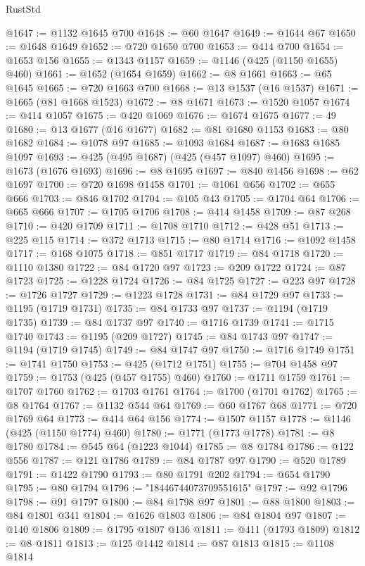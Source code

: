 \begin{lexlean}{RustStd}
\begin{coremodule}
{\begin{coremodule}
{{{{{{{{{{{{{{{{{{{{{{{{{{{{{{{{{{{{{{{{{{{{{{{{{{{{{{@1647 := @1132 @1645 @700
@1648 := @60 @1647
@1649 := @1644 @67
@1650 := @1648 @1649
@1652 := @720 @1650 @700
@1653 := @414 @700
@1654 := @1653 @156
@1655 := @1343 @1157
@1659 := @1146 (@425 (@1150 @1655) @460)
@1661 := @1652 (@1654 @1659)
@1662 := @8 @1661
@1663 := @65 @1645
@1665 := @720 @1663 @700
@1668 := @13 @1537 (@16 @1537)
@1671 := @1665 (@81 @1668 @1523)
@1672 := @8 @1671
@1673 := @1520 @1057
@1674 := @414 @1057
@1675 := @420 @1069
@1676 := @1674 @1675
@1677 := 49
@1680 := @13 @1677 (@16 @1677)
@1682 := @81 @1680 @1153
@1683 := @80 @1682
@1684 := @1078 @97
@1685 := @1093 @1684
@1687 := @1683 @1685 @1097
@1693 := @425 (@495 @1687) (@425 (@457 @1097) @460)
@1695 := @1673 (@1676 @1693)
@1696 := @8 @1695
@1697 := @840 @1456
@1698 := @62 @1697
@1700 := @720 @1698 @1458
@1701 := @1061 @656
@1702 := @655 @666
@1703 := @846 @1702
@1704 := @105 @43
@1705 := @1704 @64
@1706 := @665 @666
@1707 := @1705 @1706
@1708 := @414 @1458
@1709 := @87 @268
@1710 := @420 @1709
@1711 := @1708 @1710
@1712 := @428 @51
@1713 := @225 @115
@1714 := @372 @1713
@1715 := @80 @1714
@1716 := @1092 @1458
@1717 := @168 @1075
@1718 := @851 @1717
@1719 := @84 @1718
@1720 := @1110 @1380
@1722 := @84 @1720 @97
@1723 := @209 @1722
@1724 := @87 @1723
@1725 := @1228 @1724
@1726 := @84 @1725
@1727 := @223 @97
@1728 := @1726 @1727
@1729 := @1223 @1728
@1731 := @84 @1729 @97
@1733 := @1195 (@1719 @1731)
@1735 := @84 @1733 @97
@1737 := @1194 (@1719 @1735)
@1739 := @84 @1737 @97
@1740 := @1716 @1739
@1741 := @1715 @1740
@1743 := @1195 (@209 @1727)
@1745 := @84 @1743 @97
@1747 := @1194 (@1719 @1745)
@1749 := @84 @1747 @97
@1750 := @1716 @1749
@1751 := @1741 @1750
@1753 := @425 (@1712 @1751)
@1755 := @704 @1458 @97
@1759 := @1753 (@425 (@457 @1755) @460)
@1760 := @1711 @1759
@1761 := @1707 @1760
@1762 := @1703 @1761
@1764 := @1700 (@1701 @1762)
@1765 := @8 @1764
@1767 := @1132 @544 @64
@1769 := @60 @1767 @68
@1771 := @720 @1769 @64
@1773 := @414 @64 @156
@1774 := @1507 @1157
@1778 := @1146 (@425 (@1150 @1774) @460)
@1780 := @1771 (@1773 @1778)
@1781 := @8 @1780
@1784 := @545 @64 (@1223 @1044)
@1785 := @8 @1784
@1786 := @122 @556
@1787 := @121 @1786
@1789 := @84 @1787 @97
@1790 := @520 @1789
@1791 := @1422 @1790
@1793 := @80 @1791 @202
@1794 := @654 @1790
@1795 := @80 @1794
@1796 := "18446744073709551615"
@1797 := @92 @1796
@1798 := @91 @1797
@1800 := @84 @1798 @97
@1801 := @88 @1800
@1803 := @84 @1801 @341
@1804 := @1626 @1803
@1806 := @84 @1804 @97
@1807 := @140 @1806
@1809 := @1795 @1807 @136
@1811 := @411 (@1793 @1809)
@1812 := @8 @1811
@1813 := @125 @1442
@1814 := @87 @1813
@1815 := @1108 @1814
}}}}}}}}}}}}}}}}}}}}}}}}}}}}}}}}}}}}}}}}}}}}}}}}}}}}}}
\end{coremodule}}
\end{coremodule}
\end{lexlean}
